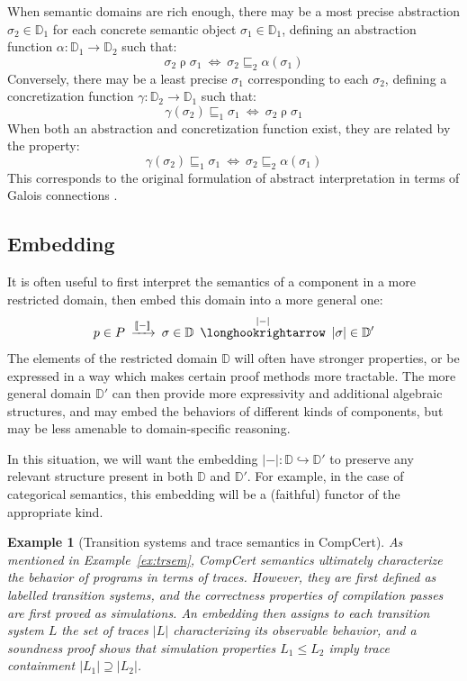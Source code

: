 \documentclass[11pt,oneside,draft]{book}
\newtheorem{example}[theorem]{Example}
\theoremstyle{definition}
\newcommand{\refby}{\sqsubseteq} %
\begin{document}
When semantic domains are rich enough,
there may be a most precise
abstraction $\sigma_2 \in \mathbb{D}_1$
for each concrete semantic object
$\sigma_1 \in \mathbb{D}_1$,
defining an abstraction function
$\alpha : \mathbb{D}_1 \rightarrow \mathbb{D}_2$
such that:
\[
  \sigma_2 \mathrel{\rho} \sigma_1
  \: \Leftrightarrow \:
  \sigma_2 \refby_2 \alpha(\sigma_1)
\]
Conversely,
there may be a least precise $\sigma_1$
corresponding to each $\sigma_2$,
defining
a concretization function
$\gamma : \mathbb{D}_2 \rightarrow \mathbb{D}_1$
such that:
\[
  \gamma(\sigma_2) \refby_1 \sigma_1
  \: \Leftrightarrow \:
  \sigma_2 \mathrel{\rho} \sigma_1
\]
When both an abstraction and concretization function exist,
they are related by the property:
\[
  \gamma(\sigma_2) \refby_1 \sigma_1
  \: \Leftrightarrow \:
  \sigma_2 \refby_2 \alpha(\sigma_1)
\]
This corresponds to
the original formulation of abstract interpretation \citep{absint}
in terms of Galois connections \citep{pgc}.


\subsection{Embedding} %

It is often useful to first interpret the semantics of a component
in a more restricted domain,
then embed this domain into a more general one:
\[
    p \in P
    \: \xrightarrow{\llbracket - \rrbracket} \:
    \sigma \in \mathbb{D}
    \: \stackrel{|-|}{\longhookrightarrow} \:
    |\sigma| \in \mathbb{D}'
\]
The elements of the restricted domain $\mathbb{D}$
will often have stronger properties,
or be expressed in a way which makes certain
proof methods more tractable.
The more general domain $\mathbb{D}'$
can then provide more expressivity
and additional algebraic structures,
and may embed the behaviors of different kinds of components,
but may be less amenable to domain-specific reasoning.

In this situation,
we will want the embedding
$|-| : \mathbb{D} \hookrightarrow \mathbb{D}'$
to preserve any relevant structure present in both
$\mathbb{D}$ and $\mathbb{D}'$.
For example,
in the case of categorical semantics,
this embedding will be a (faithful) functor
of the appropriate kind.

\begin{example}[Transition systems and trace semantics in CompCert] %
As mentioned in Example~\ref{ex:trsem},
CompCert semantics
ultimately characterize the behavior of programs
in terms of traces.
However,
they are first defined as labelled transition systems,
and the correctness properties of compilation passes
are first proved as simulations.
An embedding then assigns to each transition system $L$
the set of traces $|L|$ characterizing
its observable behavior,
and a soundness proof shows that
simulation properties $L_1 \le L_2$
imply trace containment $|L_1| \supseteq |L_2|$.
\end{example}
\end{document}
